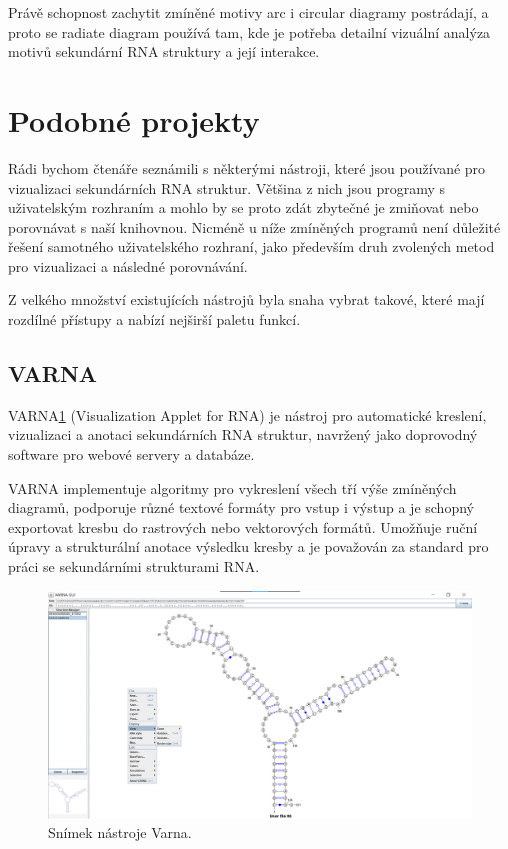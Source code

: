 Právě schopnost zachytit zmíněné motivy arc i circular diagramy postrádají, a
proto se radiate diagram používá tam, kde je potřeba detailní vizuální analýza
motivů sekundární RNA struktury a její interakce. 


\section{Podobné projekty} \label{projekty}

Rádi bychom čtenáře seznámili s některými nástroji, které jsou používané pro
vizualizaci sekundárních RNA struktur. Většina z nich jsou programy s
uživatelským rozhraním a mohlo by se proto zdát zbytečné je zmiňovat nebo
porovnávat s naší knihovnou. Nicméně u níže zmíněných programů není důležité
řešení samotného uživatelského rozhraní, jako především druh zvolených metod
pro vizualizaci a následné porovnávání.

Z velkého množství existujících nástrojů byla snaha vybrat takové, které mají
rozdílné přístupy a nabízí nejširší paletu funkcí.

\subsection{VARNA} 

VARNA\ref{var} (Visualization Applet for RNA) je nástroj pro automatické
kreslení, vizualizaci a anotaci sekundárních RNA struktur, navržený jako
doprovodný software pro webové servery a databáze.

VARNA implementuje algoritmy pro vykreslení všech tří výše zmíněných diagramů,
podporuje různé textové formáty pro vstup i výstup a je schopný exportovat
kresbu do rastrových nebo vektorových formátů. Umožňuje ruční úpravy a
strukturální anotace výsledku kresby a je považován za standard pro práci se
sekundárními strukturami RNA.

\begin{figure}[H]
  \centering
  \includegraphics[width=140mm]{../img/kap01/tools/varna.png}
  \caption[Snímek nástroje Varna]{Snímek nástroje Varna.}
  \label{var}
\end{figure}

